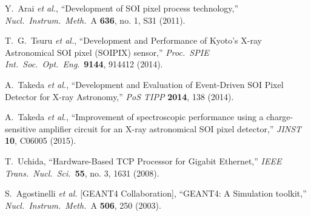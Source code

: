 \documentclass[12pt]{article}
\begin{document}
\begin{thebibliography}{99}

 
 



  Y.~Arai {\it et al.},
  ``Development of SOI pixel process technology,''
  \textit{Nucl.\ Instrum.\ Meth.}\ A {\bf 636}, no. 1, S31 (2011).


  T.~G.~Tsuru {\it et al.},
 ``Development and Performance of Kyoto's X-ray Astronomical SOI pixel (SOIPIX) sensor,''
  \textit{Proc.\ SPIE Int.\ Soc.\ Opt.\ Eng}.\  {\bf 9144}, 914412 (2014).

  A.~Takeda {\it et al.},
  ``Development and Evaluation of Event-Driven SOI Pixel Detector for X-ray Astronomy,''
  \textit{PoS TIPP} {\bf 2014}, 138 (2014).


 
 A.~Takeda \textit{et al.},
 ``Improvement of spectroscopic performance using a charge-sensitive amplifier circuit for an X-ray astronomical SOI pixel detector,''
 \textit{JINST} {\bf 10}, C06005 (2015).
 
  T.~Uchida,
  ``Hardware-Based TCP Processor for Gigabit Ethernet,''
  \textit{IEEE Trans.\ Nucl.\ Sci.}\  {\bf 55}, no. 3, 1631 (2008).
 
  S.~Agostinelli {\it et al.}  [GEANT4 Collaboration],
  ``GEANT4: A Simulation toolkit,''
  \textit{Nucl.\ Instrum.\ Meth.}\ A {\bf 506}, 250 (2003).
 

\end{thebibliography}
\end{document}
